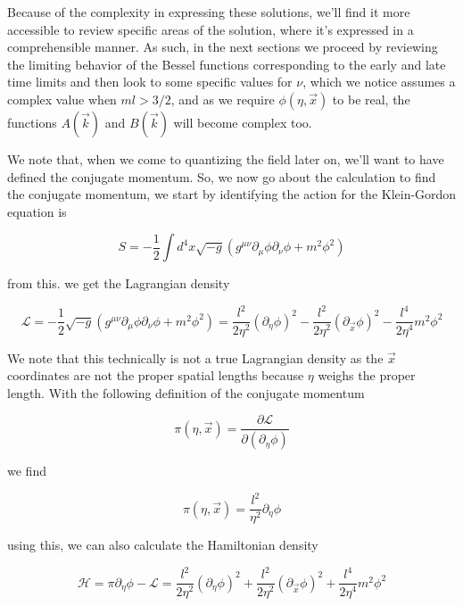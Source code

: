 \documentclass[a4paper,11pt]{article}
\numberwithin{equation}{section}
\numberwithin{figure}{section}
\begin{document}
\begin{large}
\vspace{0.5cm}

Because of the complexity in expressing these solutions, we'll find it more accessible to review specific areas of the solution, where it's expressed in a comprehensible manner. As such, in the next sections we proceed by reviewing the limiting behavior of the Bessel functions corresponding to the early and late time limits and then look to some specific values for $\nu$, which we notice assumes a complex value when $ml>3/2$, and as we require $\phi(\eta,\Vec{x})$ to be real, the functions $A(\Vec{k})$ and $B(\Vec{k})$ will become complex too.

We note that, when we come to quantizing the field later on, we'll want  to have defined the conjugate momentum. So, we now go about the calculation to find the conjugate momentum, we start by identifying the action for the Klein-Gordon equation is 

\begin{equation}
\label{KGaction}    
    S=-\frac{1}{2}\int d^4x\sqrt{-g}(g^{\mu\nu}\partial_\mu\phi\partial_\nu\phi+m^2\phi^2) 
\end{equation}

from this. we get the Lagrangian density

\begin{equation}
\label{Ldensity}    
    \mathcal{L}=-\frac{1}{2}\sqrt{-g}(g^{\mu\nu}\partial_\mu\phi\partial_\nu\phi+m^2\phi^2)=\frac{l^2}{2\eta^2} (\partial_\eta\phi)^2-\frac{l^2}{2\eta^2}(\partial_{\Vec{x}}\phi)^2-\frac{l^4}{2\eta^4}m^2\phi^2
\end{equation}

We note that this technically is not a true Lagrangian density as the $\Vec{x}$ coordinates are not the proper spatial lengths because $\eta$ weighs the proper length. With the following definition of the conjugate momentum 

$$\pi(\eta,\Vec{x})=\frac{\partial\mathcal{L}}{\partial(\partial_\eta\phi)}$$

we find 

\begin{equation}
\label{conjmom}    
    \pi(\eta,\Vec{x})=\frac{l^2}{\eta^2}\partial_\eta\phi
\end{equation}

using this, we can also calculate the Hamiltonian density

\begin{equation}
\label{classicHam}    
    \mathcal{H}=\pi\partial_\eta\phi-\mathcal{L}=\frac{l^2}{2\eta^2} (\partial_\eta\phi)^2+\frac{l^2}{2\eta^2}(\partial_{\Vec{x}}\phi)^2+\frac{l^4}{2\eta^4}m^2\phi^2
\end{equation}


\end{large}
\end{document}
